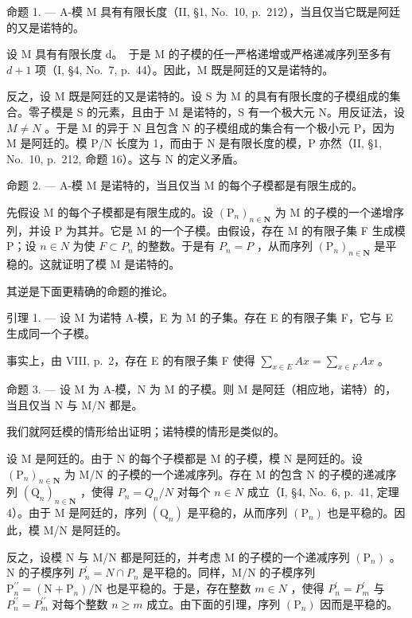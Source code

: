 命题 1. --- A-模 M 具有有限长度（II, §1, No.~10, p.~212），当且仅当它既是阿廷的又是诺特的。

设 M 具有有限长度 d。~于是 M 的子模的任一严格递增或严格递减序列至多有 \(d+1\) 项（I, §4, No.~7, p.~44）。因此，M 既是阿廷的又是诺特的。

反之，设 M 既是阿廷的又是诺特的。设 S 为 M 的具有有限长度的子模组成的集合。零子模是 S 的元素，且由于 M 是诺特的，S 有一个极大元 N。用反证法，设 \(M \neq N\) 。于是 M 的异于 N 且包含 N 的子模组成的集合有一个极小元 P，因为 M 是阿廷的。模 P/N 长度为 1，而由于 N 是有限长度的模，P 亦然（II, §1, No.~10, p.~212, 命题 16）。这与 N 的定义矛盾。

命题 2. --- A-模 M 是诺特的，当且仅当 M 的每个子模都是有限生成的。

先假设 M 的每个子模都是有限生成的。设 \((\mathrm{P}_{n})_{n\in\mathbf{N}}\) 为 M 的子模的一个递增序列，并设 P 为其并。它是 M 的一个子模。由假设，存在 M 的有限子集 F 生成模 P；设 \(n\in N\) 为使 \(F\subset P_{n}\) 的整数。于是有 \(P_{n}=P\) ，从而序列 \((\mathrm{P}_{n})_{n\in\mathbf{N}}\) 是平稳的。这就证明了模 M 是诺特的。

其逆是下面更精确的命题的推论。

引理 1. --- 设 M 为诺特 A-模，E 为 M 的子集。存在 E 的有限子集 F，它与 E 生成同一个子模。

事实上，由 VIII, p.~2，存在 E 的有限子集 F 使得 \(\sum_{x\in E}Ax=\sum_{x\in F}Ax\) 。

命题 3. --- 设 M 为 A-模，N 为 M 的子模。则 M 是阿廷（相应地，诺特）的，当且仅当 N 与 M/N 都是。

我们就阿廷模的情形给出证明；诺特模的情形是类似的。

设 M 是阿廷的。由于 N 的每个子模都是 M 的子模，模 N 是阿廷的。设 \((\mathrm{P}_{n})_{n\in\mathbf{N}}\) 为 M/N 的子模的一个递减序列。存在 M 的包含 N 的子模的递减序列 \((\mathrm{Q}_{n})_{n\in\mathbf{N}}\) ，使得 \(P_{n}=Q_{n}/N\) 对每个 \(n\in N\) 成立（I, §4, No.~6, p.~41, 定理 4）。由于 M 是阿廷的，序列 \((\mathrm{Q}_{n})\) 是平稳的，从而序列 \((\mathrm{P}_{n})\) 也是平稳的。因此，模 M/N 是阿廷的。

反之，设模 N 与 M/N 都是阿廷的，并考虑 M 的子模的一个递减序列 \((\mathrm{P}_{n})\) 。N 的子模序列 \(P_{n}^{\prime} = N \cap P_{n}\) 是平稳的。同样，M/N 的子模序列 \(\mathrm{P}_{n}^{\prime\prime} = (\mathrm{N} + \mathrm{P}_{n})/\mathrm{N}\) 也是平稳的。于是，存在整数 \(m \in N\) ，使得 \(P_{n}^{\prime} = P_{m}^{\prime}\) 与 \(P_{n}^{\prime\prime} = P_{m}^{\prime\prime}\) 对每个整数 \(n \geqslant m\) 成立。由下面的引理，序列 \((\mathrm{P}_{n})\) 因而是平稳的。


